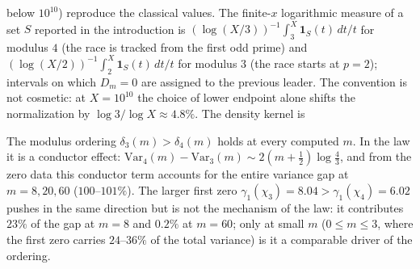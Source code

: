 below $10^{10}$) reproduce the classical values. The finite-$x$
logarithmic measure of a set $S$ reported in the introduction is
$(\log(X/3))^{-1}\int_3^X\mathbf 1_S(t)\,dt/t$ for modulus $4$ (the
race is tracked from the first odd prime) and
$(\log(X/2))^{-1}\int_2^X\mathbf 1_S(t)\,dt/t$ for modulus $3$ (the
race starts at $p=2$); intervals on which $D_m=0$ are assigned to the
previous leader. The convention is not cosmetic: at $X=10^{10}$ the
choice of lower endpoint alone shifts the normalization by
$\log 3/\log X\approx4.8\%$. The density kernel is


The modulus ordering
$\delta_3(m)>\delta_4(m)$ holds at every computed $m$. In the law it is
a conductor effect: $\mathrm{Var}_4(m)-\mathrm{Var}_3(m)\sim
2(m+\tfrac12)\log\tfrac43$, and from the zero data this conductor term
accounts for the entire variance gap at $m=8,20,60$
($100$--$101\%$). The larger first zero
$\gamma_1(\chi_3)=8.04>\gamma_1(\chi_4)=6.02$ pushes in the same
direction but is not the mechanism of the law: it contributes $23\%$ of
the gap at $m=8$ and $0.2\%$ at $m=60$; only at small $m$ ($0\le m\le3$,
where the first zero carries $24$--$36\%$ of the total variance) is it
a comparable driver of the ordering.


